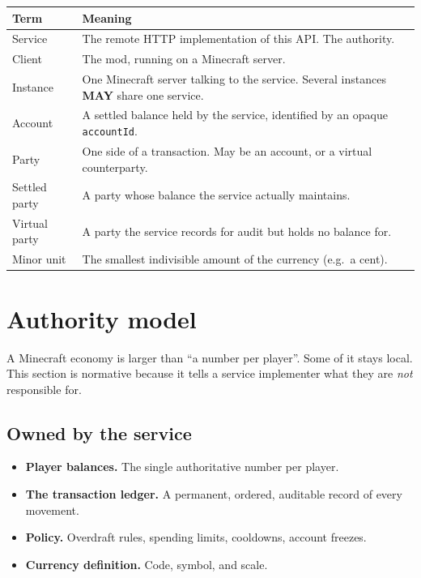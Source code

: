 \documentclass[11pt,a4paper]{article}
\newcommand{\code}[1]{\texttt{\small #1}}
\newcommand{\opt}{\textbf{MAY}}
\begin{document}
\begin{tabularx}{\linewidth}{L{3.1cm} X}
\toprule
\textbf{Term} & \textbf{Meaning}\\
\midrule
Service        & The remote HTTP implementation of this API. The authority.\\
Client         & The mod, running on a Minecraft server.\\
Instance       & One Minecraft server talking to the service. Several instances \opt{} share one service.\\
Account        & A settled balance held by the service, identified by an opaque \code{accountId}.\\
Party          & One side of a transaction. May be an account, or a virtual counterparty.\\
Settled party  & A party whose balance the service actually maintains.\\
Virtual party  & A party the service records for audit but holds no balance for.\\
Minor unit     & The smallest indivisible amount of the currency (e.g.\ a cent).\\
\bottomrule
\end{tabularx}

\section{Authority model}

A Minecraft economy is larger than ``a number per player''. Some of it stays local. This section is
normative because it tells a service implementer what they are \emph{not} responsible for.

\subsection{Owned by the service}
\begin{itemize}
\item \textbf{Player balances.} The single authoritative number per player.
\item \textbf{The transaction ledger.} A permanent, ordered, auditable record of every movement.
\item \textbf{Policy.} Overdraft rules, spending limits, cooldowns, account freezes.
\item \textbf{Currency definition.} Code, symbol, and scale.
\end{itemize}
\end{document}

